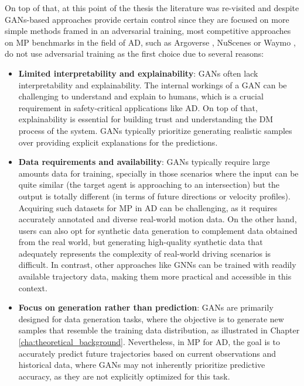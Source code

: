 On top of that, at this point of the thesis the literature was re-visited and despite \acp{GAN}-based approaches \cite{sadeghian2019sophie, dendorfer2020goal, gupta2018social, gomez2022exploring} provide certain control since they are focused on more simple methods framed in an adversarial training, most competitive approaches on \ac{MP} benchmarks in the field of \ac{AD}, such as Argoverse \cite{chang2019argoverse}, NuScenes \cite{caesar2020nuscenes} or Waymo \cite{ettinger2021large}, do not use adversarial training as the first choice due to several reasons:

\begin{itemize}
	
	\item \textbf{Limited interpretability and explainability}: \acp{GAN} often lack interpretability and explainability. The internal workings of a \ac{GAN} can be challenging to understand and explain to humans, which is a crucial requirement in safety-critical applications like \ac{AD}. On top of that, explainability is essential for building trust and understanding the \ac{DM} process of the system. \acp{GAN} typically prioritize generating realistic samples over providing explicit explanations for the predictions.
	
	\item \textbf{Data requirements and availability}: \acp{GAN} typically require large amounts data for training, specially in those scenarios where the input can be quite similar (the target agent is approaching to an intersection) but the output is totally different (in terms of future directions or velocity profiles). Acquiring such datasets for \ac{MP} in \ac{AD} can be challenging, as it requires accurately annotated and diverse real-world motion data. On the other hand, users can also opt for synthetic data generation to complement data obtained from the real world, but generating high-quality synthetic data that adequately represents the complexity of real-world driving scenarios is difficult. In contrast, other approaches like \acp{GNN} can be trained with readily available trajectory data, making them more practical and accessible in this context.
	
	\item \textbf{Focus on generation rather than prediction}: \acp{GAN} are primarily designed for data generation tasks, where the objective is to generate new samples that resemble the training data distribution, as illustrated in Chapter \ref{cha:theoretical_background}. Nevertheless, in \ac{MP} for \ac{AD}, the goal is to accurately predict future trajectories based on current observations and historical data, where \acp{GAN} may not inherently prioritize predictive accuracy, as they are not explicitly optimized for this task.
	
\end{itemize}

